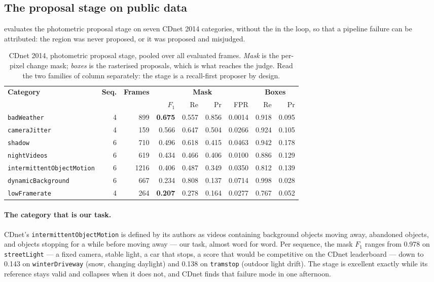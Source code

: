 \subsection{The proposal stage on public data}
\label{sec:results:cdnet}

 evaluates the photometric proposal stage on seven CDnet 2014
categories, without the \judge{} in the loop, so that a pipeline failure can be
attributed: the region was never proposed, or it was proposed and misjudged.

\begin{table}[t]
\centering
\caption{CDnet 2014, photometric proposal stage, pooled over all evaluated
frames. \emph{Mask} is the per-pixel change mask; \emph{boxes} is the
rasterised proposals, which is what reaches the judge. Read the two families of
column separately: the stage is a recall-first proposer by design.}
\label{tab:cdnet}
\small
\begin{tabular}{@{}lrrrrrrrr@{}}
\toprule
\multirow{2}{*}{\textbf{Category}} & \multirow{2}{*}{\textbf{Seq.}} &
\multirow{2}{*}{\textbf{Frames}} &
\multicolumn{4}{c}{\textbf{Mask}} & \multicolumn{2}{c}{\textbf{Boxes}} \\
\cmidrule(lr){4-7}\cmidrule(l){8-9}
 & & & $F_1$ & Re & Pr & FPR & Re & Pr \\
\midrule
\texttt{badWeather}    & 4 &  899 & \textbf{0.675} & 0.557 & 0.856 & 0.0014 & 0.918 & 0.095 \\
\texttt{cameraJitter}  & 4 &  159 & 0.566 & 0.647 & 0.504 & 0.0266 & 0.924 & 0.105 \\
\texttt{shadow}        & 6 &  710 & 0.496 & 0.618 & 0.415 & 0.0463 & 0.942 & 0.178 \\
\texttt{nightVideos}   & 6 &  619 & 0.434 & 0.466 & 0.406 & 0.0100 & 0.886 & 0.129 \\
\texttt{intermittentObjectMotion} & 6 & 1216 & 0.406 & 0.487 & 0.349 & 0.0350 & 0.812 & 0.139 \\
\texttt{dynamicBackground} & 6 & 667 & 0.234 & 0.808 & 0.137 & 0.0714 & 0.998 & 0.028 \\
\texttt{lowFramerate}  & 4 &  264 & \textbf{0.207} & 0.278 & 0.164 & 0.0277 & 0.767 & 0.052 \\
\bottomrule
\end{tabular}
\end{table}

\paragraph{The category that is our task.}
CDnet's \texttt{intermittentObjectMotion} is defined by its authors as videos
containing background objects moving away, abandoned objects, and objects
stopping for a while before moving away --- our task, almost word for word.
Per sequence, the mask $F_1$ ranges from 0.978 on \texttt{streetLight} --- a
fixed camera, stable light, a car that stops, a score that would be competitive
on the CDnet leaderboard --- down to 0.143 on \texttt{winterDriveway} (snow,
changing daylight) and 0.138 on \texttt{tramstop} (outdoor light drift). The
stage is excellent exactly while its reference stays valid and collapses when
it does not, and CDnet finds that failure mode in one afternoon.

